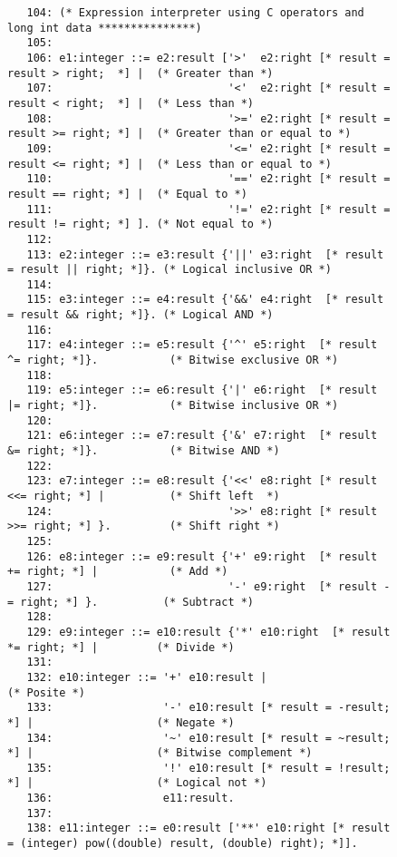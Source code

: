 \begin{figure}
\hspace*{-3.5cm}
\begin{minipage}{30cm}
\footnotesize
\begin{verbatim}
   104: (* Expression interpreter using C operators and long int data ***************)
   105: 
   106: e1:integer ::= e2:result ['>'  e2:right [* result = result > right;  *] |  (* Greater than *)
   107:                           '<'  e2:right [* result = result < right;  *] |  (* Less than *)
   108:                           '>=' e2:right [* result = result >= right; *] |  (* Greater than or equal to *)
   109:                           '<=' e2:right [* result = result <= right; *] |  (* Less than or equal to *)
   110:                           '==' e2:right [* result = result == right; *] |  (* Equal to *)
   111:                           '!=' e2:right [* result = result != right; *] ]. (* Not equal to *)
   112: 
   113: e2:integer ::= e3:result {'||' e3:right  [* result = result || right; *]}. (* Logical inclusive OR *)
   114: 
   115: e3:integer ::= e4:result {'&&' e4:right  [* result = result && right; *]}. (* Logical AND *)
   116: 
   117: e4:integer ::= e5:result {'^' e5:right  [* result ^= right; *]}.           (* Bitwise exclusive OR *)
   118: 
   119: e5:integer ::= e6:result {'|' e6:right  [* result |= right; *]}.           (* Bitwise inclusive OR *)
   120: 
   121: e6:integer ::= e7:result {'&' e7:right  [* result &= right; *]}.           (* Bitwise AND *)
   122: 
   123: e7:integer ::= e8:result {'<<' e8:right [* result <<= right; *] |          (* Shift left  *)
   124:                           '>>' e8:right [* result >>= right; *] }.         (* Shift right *)
   125:
   126: e8:integer ::= e9:result {'+' e9:right  [* result += right; *] |           (* Add *)
   127:                           '-' e9:right  [* result -= right; *] }.          (* Subtract *)
   128:
   129: e9:integer ::= e10:result {'*' e10:right  [* result *= right; *] |         (* Divide *)
   131:
   132: e10:integer ::= '+' e10:result |                                           (* Posite *)
   133:                 '-' e10:result [* result = -result; *] |                   (* Negate *)
   134:                 '~' e10:result [* result = ~result; *] |                   (* Bitwise complement *)
   135:                 '!' e10:result [* result = !result; *] |                   (* Logical not *)
   136:                 e11:result.
   137: 
   138: e11:integer ::= e0:result ['**' e10:right [* result = (integer) pow((double) result, (double) right); *]].

\end{verbatim}
\end{minipage}
\end{figure}
